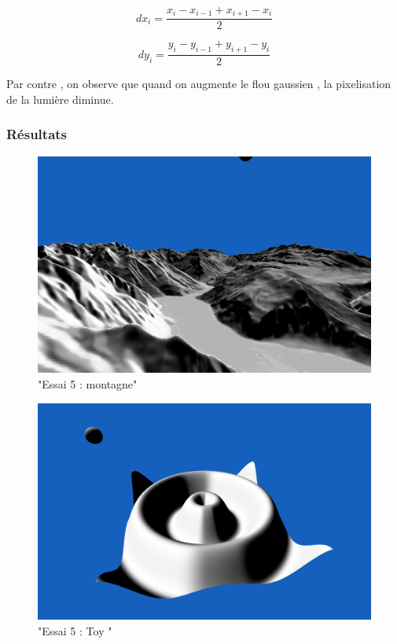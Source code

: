 \documentclass[a4paper]{article}
\begin{document}
\[dx_i = \frac{x_i - x_{i-1} + x_{i+1} - x_{i} }{2}\]

\[dy_i = \frac{y_i - y_{i-1} + y_{i+1} - y_{i} }{2}\]


Par contre , on observe que quand on augmente le flou gaussien , la pixelisation de la lumière diminue. 

\subsubsection{Résultats}
\begin{figure}[thb]
	\centering
    \includegraphics[scale=0.3]{Images/Essais/Essai_5_mount.png}
    \caption{"Essai 5 : montagne"}
 \end{figure}



\begin{figure}[thb]
	\centering
    \includegraphics[scale=0.3]{Images/Essais/Essai_5_toy.png}
    \caption{"Essai 5 : Toy "}
 \end{figure}
\end{document}
